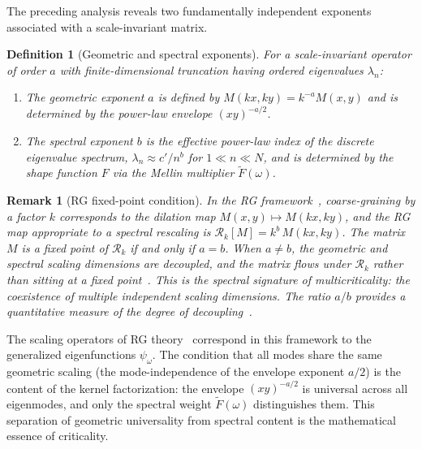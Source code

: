\documentclass[12pt]{article}
\newtheorem{definition}[theorem]{Definition}
\newtheorem{remark}[theorem]{Remark}
\begin{document}
The preceding analysis reveals two fundamentally independent exponents associated with a scale-invariant matrix.

\begin{definition}[Geometric and spectral exponents]\label{def:exponents}
For a scale-invariant operator of order $a$ with finite-dimensional truncation having ordered eigenvalues $\lambda_n$:
\begin{enumerate}[label=\emph{(\roman*)},nosep]
\item The \emph{geometric exponent} $a$ is defined by $M(kx,ky) = k^{-a} M(x,y)$ and is determined by the power-law envelope $(xy)^{-a/2}$.
\item The \emph{spectral exponent} $b$ is the effective power-law index of the discrete eigenvalue spectrum, $\lambda_n \approx c'/n^b$ for $1 \ll n \ll N$, and is determined by the shape function $F$ via the Mellin multiplier $\widetilde{F}(\omega)$.
\end{enumerate}
\end{definition}

\begin{remark}[RG fixed-point condition]\label{rem:fixedpoint}
In the RG framework~\cite{Wilson1971,WilsonKogut1974,Fisher1998,Cardy1996,ItzyksonZuber2006}, coarse-graining by a factor $k$ corresponds to the dilation map $M(x,y) \mapsto M(kx,ky)$, and the RG map appropriate to a spectral rescaling is $\mathcal{R}_k[M] = k^b\, M(kx,ky)$. The matrix $M$ is a fixed point of $\mathcal{R}_k$ if and only if $a = b$. When $a \neq b$, the geometric and spectral scaling dimensions are decoupled, and the matrix flows under $\mathcal{R}_k$ rather than sitting at a fixed point~\cite{Wegner1972,ZinnJustin2002}. This is the spectral signature of \emph{multicriticality}: the coexistence of multiple independent scaling dimensions. The ratio $a/b$ provides a quantitative measure of the degree of decoupling~\cite{msi2026}.
\end{remark}

The scaling operators of RG theory~\cite{Fisher1998,Cardy1996,Sornette2006} correspond in this framework to the generalized eigenfunctions $\psi_\omega$. The condition that all modes share the same geometric scaling (the mode-independence of the envelope exponent $a/2$) is the content of the kernel factorization: the envelope $(xy)^{-a/2}$ is universal across all eigenmodes, and only the spectral weight $\widetilde{F}(\omega)$ distinguishes them. This separation of geometric universality from spectral content is the mathematical essence of criticality.
\end{document}
